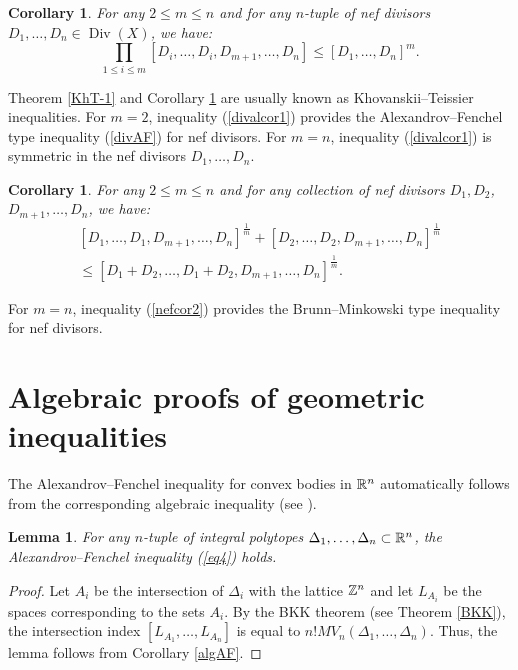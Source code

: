 \documentclass[11pt]{article}
\theoremstyle{plain}
\newtheorem{lemma}[theorem]{Lemma}
\newtheorem{corollary}[theorem]{Corollary}
\theoremstyle{definition}
\newcommand\Div{\operatorname{Div}}
\begin{document}
\begin{corollary}\label{KhT-2} For any $2\leq m\leq n$ and for any $n$-tuple of  nef  divisors  $ D_1,\dots,  D_n \in \Div (X)$, we have:
\begin{equation}\label{divalcor1}
 \prod_{1\leq i\leq m} [ D_i,\dots, D_i,  D_{m+1}, \dots,  D_n]\leq [ D_1,\dots, D_n]^m.
 \end{equation}
\end{corollary}

Theorem \ref{KhT-1} and Corollary \ref{KhT-2} are usually known as Khovanskii--Teissier inequalities. For $m=2$, inequality (\ref{divalcor1}) provides the Alexandrov--Fenchel type inequality  (\ref{divAF}) for nef  divisors. For $m=n$,  inequality (\ref{divalcor1}) is symmetric in the nef  divisors   $ D_1,\dots, D_n$.

\begin{corollary}  For any $2\leq m\leq n$ and for any collection of nef   divisors  $D_1,  D_2$, $ D_{m+1},\dots, D_n$, we have:
\begin{equation}\label{nefcor2}\begin{aligned}
 [ D_1,\dots, D_1, D_{m+1},\dots, D_n]^ {\frac{1}{m}}+  [ D_2,\dots, D_2, D_{m+1},\dots, D_n]^ {\frac{1}{m}}\\
\leq  [ D_1 + D_2,\dots, D_1 + D_2, D_{m+1},\dots, D_n]^{\frac{1}{m}}.
\end{aligned}\end{equation}
\end{corollary}

For $m=n$, inequality (\ref{nefcor2})
provides the  Brunn--Minkowski  type inequality for nef  divisors.

\section{Algebraic proofs of geometric inequalities}\label{sect8}

The Alexandrov--Fenchel inequality  for convex bodies in $\Bbb R^n$  automatically follows from the corresponding algebraic inequality (see  \cite{Kh88}).

\begin{lemma}\label{intBKK}  For any $n$-tuple of integral polytopes $\Delta_1,\dots, \Delta_n\subset \Bbb R^n$, the Alexandrov--Fenchel inequality (\ref{eq4}) holds.
\end{lemma}

\begin{proof} Let $A_i$ be the intersection of $\Delta_i$ with the lattice $ \Bbb Z^n$ and let $L_{A_i}$ be the spaces corresponding to the sets $A_i$. By the BKK theorem (see Theorem \ref{BKK}), the intersection index $[L_{A_1},\dots,L_{A_n}]$ is equal to  $n!MV_n(\Delta_1,\dots, \Delta_n)$. Thus, the lemma follows from Corollary \ref{algAF}.
\end{proof}
\end{document}
